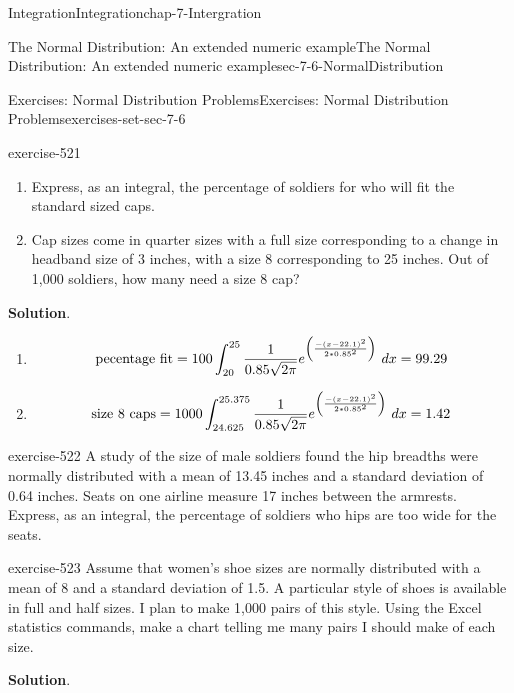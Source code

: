 \documentclass[oneside,10pt,]{book}
\numberwithin{equation}{section}
\begin{document}
\begin{chapterptx}{Integration}{}{Integration}{}{}{chap-7-Intergration}
\begin{sectionptx}{The Normal Distribution: An extended numeric example}{}{The Normal Distribution: An extended numeric example}{}{}{sec-7-6-NormalDistribution}
\begin{exercises-subsection-numberless}{Exercises: Normal Distribution Problems}{}{Exercises: Normal Distribution Problems}{}{}{exercises-set-sec-7-6}
\begin{divisionexercise}{5}{}{}{exercise-521}
\leavevmode%
\begin{enumerate}[label=(\alph*)]
\item\hypertarget{li-788}{}\hypertarget{p-2982}{}%
Express, as an integral, the percentage of soldiers for who will fit the standard sized caps.%
\item\hypertarget{li-789}{}\hypertarget{p-2983}{}%
Cap sizes come in quarter sizes with a full size corresponding to a change in headband size of 3 inches, with a size 8 corresponding to 25 inches.  Out of 1,000 soldiers, how many need a size 8 cap?%
\end{enumerate}
\par\smallskip%
\noindent\textbf{Solution}.\hypertarget{solution-264}{}\quad%
\leavevmode%
\begin{enumerate}[label=(\alph*)]
\item\hypertarget{li-790}{}%
\begin{equation*}
\hbox{pecentage fit}=100\int_{20}^{25}\frac{1}{0.85\sqrt{2\pi}} e^{\left({\frac{-(x-22.1)^2}{2*0.85^2}}\right)}\ dx =99.29
\end{equation*}
%
\item\hypertarget{li-791}{}%
\begin{equation*}
\hbox{size 8 caps}=1000\int_{24.625}^{25.375}\frac{1}{0.85\sqrt{2\pi}} e^{\left({\frac{-(x-22.1)^2}{2*0.85^2}}\right)}\ dx =1.42
\end{equation*}
%
\end{enumerate}
\end{divisionexercise}%
\begin{divisionexercise}{6}{}{}{exercise-522}%
\hypertarget{p-2984}{}%
A study of the size of male soldiers found the hip breadths were normally distributed with a mean of 13.45 inches and a standard deviation of 0.64 inches.  Seats on one airline measure 17 inches between the armrests.  Express, as an integral, the percentage of soldiers who hips are too wide for the seats.%
\end{divisionexercise}%
\begin{divisionexercise}{7}{}{}{exercise-523}%
\hypertarget{p-2985}{}%
Assume that women’s shoe sizes are normally distributed with a mean of 8 and a standard deviation of 1.5.  A particular style of shoes is available in full and half sizes.  I plan to make 1,000 pairs of this style.  Using the Excel statistics commands, make a chart telling me many pairs I should make of each size.%
\par\smallskip%
\noindent\textbf{Solution}.\hypertarget{solution-265}{}\quad%
\hypertarget{p-2986}{}%

\end{divisionexercise}
\end{exercises-subsection-numberless}
\end{sectionptx}
\end{chapterptx}
\end{document}
